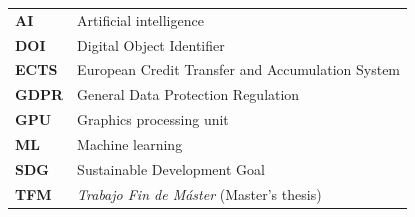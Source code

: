 
\begin{tabular}{@{}l l@{}}
  \textbf{AI}   & Artificial intelligence \\
  \textbf{DOI}  & Digital Object Identifier \\
  \textbf{ECTS} & European Credit Transfer and Accumulation System \\
  \textbf{GDPR} & General Data Protection Regulation \\
  \textbf{GPU}  & Graphics processing unit \\
  \textbf{ML}   & Machine learning \\
  \textbf{SDG}  & Sustainable Development Goal \\
  \textbf{TFM}  & \textit{Trabajo Fin de Máster} (Master's thesis) \\
\end{tabular}

\cleardoublepage
